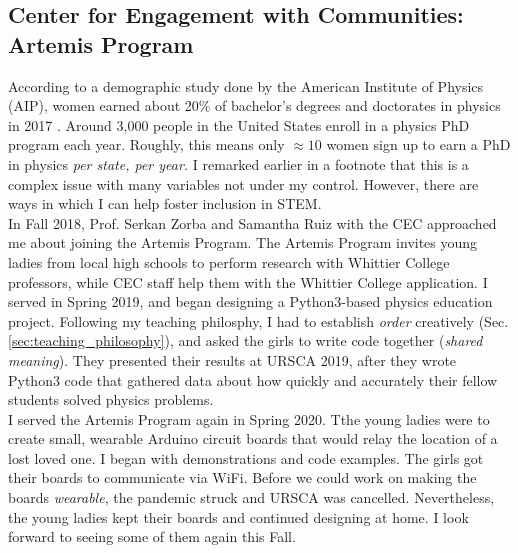 \documentclass[../../../main.tex]{subfiles}
\begin{document}
\subsection{Center for Engagement with Communities: Artemis Program}
\label{sec:cec}

According to a demographic study done by the American Institute of Physics (AIP), women earned about 20\% of bachelor's degrees and doctorates in physics in 2017 \cite{aip}.  Around 3,000 people in the United States enroll in a physics PhD program each year.  Roughly, this means only $\approx 10$ women sign up to earn a PhD in physics \textit{per state, per year.}  I remarked earlier in a footnote that this is a complex issue with many variables not under my control.  However, there are ways in which I can help foster inclusion in STEM.
\\
\vspace{0.15cm}
In Fall 2018, Prof. Serkan Zorba and Samantha Ruiz with the CEC approached me about joining the Artemis Program.  The Artemis Program invites young ladies from local high schools to perform research with Whittier College professors, while CEC staff help them with the Whittier College application.  I served in Spring 2019, and began designing a Python3-based physics education project.  Following my teaching philosphy, I had to establish \textit{order} creatively (Sec. \ref{sec:teaching_philosophy}), and asked the girls to write code together (\textit{shared meaning}).  They presented their results at URSCA 2019, after they wrote Python3 code that gathered data about how quickly and accurately their fellow students solved physics problems.
\\
\vspace{0.15cm}
I served the Artemis Program again in Spring 2020.  Tthe young ladies were to create small, wearable Arduino circuit boards that would relay the location of a lost loved one.  I began with demonstrations and code examples.  The girls got their boards to communicate via WiFi.  Before we could work on making the boards \textit{wearable}, the pandemic struck and URSCA was cancelled.  Nevertheless, the young ladies kept their boards and continued designing at home.  I look forward to seeing some of them again this Fall.
\end{document}
